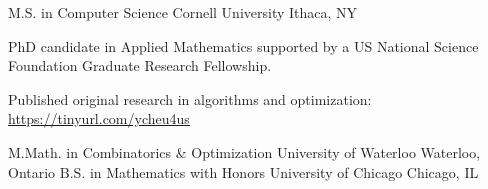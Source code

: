 

\begin{cventries}

  \cventry
    {M.S. in Computer Science} %
    {Cornell University} %
    {Ithaca, NY} %
    {} %
    {
      \begin{cvitems} %
        \item {PhD candidate in Applied Mathematics supported by a US National Science Foundation Graduate Research Fellowship.}
        \item {Published original research in algorithms and optimization: \url{https://tinyurl.com/ycheu4us}}
      \end{cvitems}
    }

  \cventry
    {M.Math. in Combinatorics \& Optimization} %
    {University of Waterloo} %
    {Waterloo, Ontario} %
    {} %
    {}
  \vspace{-1.0mm}
  \cventry
    {B.S. in Mathematics with Honors} %
    {University of Chicago} %
    {Chicago, IL} %
    {} %
    {}
  \vspace{-1.0mm}
\end{cventries}
